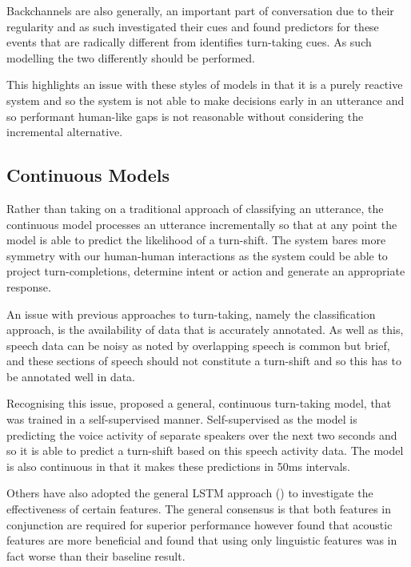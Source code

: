 \documentclass[logo,bsc,singlespacing,parskip]{infthesis}
\begin{document}
Backchannels are also generally, an important part of conversation due to their regularity and as such \cite{Gravano2011} investigated their cues and found predictors for these events that are radically different from identifies turn-taking cues. As such modelling the two differently should be performed. 

 This highlights an issue with these styles of models in that it is a purely reactive system and so the system is not able to make decisions early in an utterance and so performant human-like gaps is not reasonable without considering the incremental alternative.  

\subsection{Continuous Models}

Rather than taking on a traditional approach of classifying an utterance, the continuous model processes an utterance incrementally so that at any point the model is able to predict the likelihood of a turn-shift. The system bares more symmetry with our human-human interactions as the system could be able to project turn-completions, determine intent or action and generate an appropriate response. 

An issue with previous approaches to turn-taking, namely the classification approach, is the availability of data that is accurately annotated. As well as this, speech data can be noisy as noted by \cite{Sacks1974} overlapping speech is common but brief, and these sections of speech should not constitute a turn-shift and so this has to be annotated well in data.

Recognising this issue, \cite{Skantze2017} proposed a general, continuous turn-taking model, that was trained in a self-supervised manner. Self-supervised as the model is predicting the voice activity of separate speakers over the next two seconds and so it is able to predict a turn-shift based on this speech activity data. The model is also continuous in that it makes these predictions in 50ms intervals.

Others have also adopted the general LSTM approach (\cite{Maier2017, Roddy2018a}) to investigate the effectiveness of certain features. The general consensus is that both features in conjunction are required for superior performance however \cite{Roddy2018a} found that acoustic features are more beneficial and \cite{Maier2017} found that using only linguistic features was in fact worse than their baseline result. 
\end{document}

